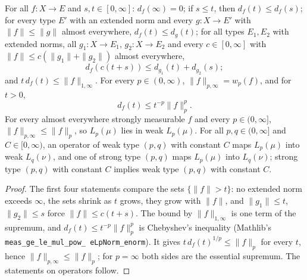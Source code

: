 \begin{lemma}
\label{lem:distribution-weak-norm-basic}
\leanok
{}
For all $f : X \to E$ and $s, t \in [0, \infty]$: $d_f(\infty) = 0$; if $s \leq t$, then
$d_f(t) \leq d_f(s)$; for every type $E'$ with an extended norm and every $g : X \to E'$ with
$\|f\| \leq \|g\|$ almost everywhere, $d_f(t) \leq d_g(t)$; for all types $E_1, E_2$ with
extended norms, all $g_1 : X \to E_1$, $g_2 : X \to E_2$ and every $c \in [0, \infty]$ with
$\|f\| \leq c (\|g_1\| + \|g_2\|)$ almost everywhere,
\[
  d_f(c (t + s)) \leq d_{g_1}(t) + d_{g_2}(s) ;
\]
and $t \, d_f(t) \leq \|f\|_{1, \infty}$. For every $p \in (0, \infty)$,
$\|f\|_{p, \infty} = w_p(f)$, and for $t > 0$,
\[
  d_f(t) \leq t^{-p} \|f\|_p^p .
\]
For every almost everywhere strongly measurable $f$ and every $p \in (0, \infty]$,
$\|f\|_{p, \infty} \leq \|f\|_p$, so $L_p(\mu)$ lies in weak $L_p(\mu)$. For all
$p, q \in (0, \infty]$ and $C \in [0, \infty)$, an operator of weak type $(p, q)$ with constant
$C$ maps $L_p(\mu)$ into weak $L_q(\nu)$, and one of strong type $(p, q)$ maps $L_p(\mu)$ into
$L_q(\nu)$; strong type $(p, q)$ with constant $C$ implies weak type $(p, q)$ with constant
$C$.
\end{lemma}

\begin{proof}
\leanok
The first four statements compare the sets $\{\|f\| > t\}$: no extended norm exceeds $\infty$,
the sets shrink as $t$ grows, they grow with $\|f\|$, and $\|g_1\| \leq t$, $\|g_2\| \leq s$
force $\|f\| \leq c (t + s)$. The bound by $\|f\|_{1, \infty}$ is one term of the supremum, and
$d_f(t) \leq t^{-p} \|f\|_p^p$ is Chebyshev's inequality (Mathlib's
\texttt{meas\_\allowbreak ge\_\allowbreak le\_\allowbreak mul\_\allowbreak pow\_\allowbreak
eLpNorm\_\allowbreak enorm}). It gives $t \, d_f(t)^{1/p} \leq \|f\|_p$ for every $t$, hence
$\|f\|_{p, \infty} \leq \|f\|_p$; for $p = \infty$ both sides are the essential supremum. The
statements on operators follow.
\end{proof}

